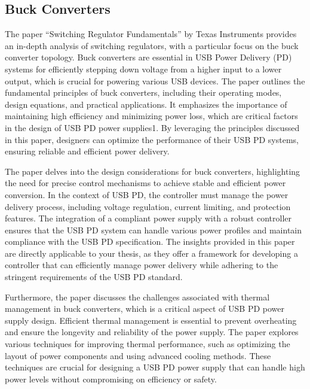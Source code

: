 \subsection{Buck Converters}
The paper “Switching Regulator Fundamentals”\cite{castaldo2019switching} by Texas Instruments provides an in-depth analysis of switching regulators, with a particular focus on the buck converter topology. Buck converters are essential in USB Power Delivery (PD) systems for efficiently stepping down voltage from a higher input to a lower output, which is crucial for powering various USB devices. The paper outlines the fundamental principles of buck converters, including their operating modes, design equations, and practical applications. It emphasizes the importance of maintaining high efficiency and minimizing power loss, which are critical factors in the design of USB PD power supplies1. By leveraging the principles discussed in this paper, designers can optimize the performance of their USB PD systems, ensuring reliable and efficient power delivery\cite{er13}.

The paper \cite{Liu2005}  delves into the design considerations for buck converters, highlighting the need for precise control mechanisms to achieve stable and efficient power conversion. In the context of USB PD, the controller must manage the power delivery process, including voltage regulation, current limiting, and protection features. The integration of a compliant power supply with a robust controller ensures that the USB PD system can handle various power profiles and maintain compliance with the USB PD specification. The insights provided in this paper are directly applicable to your thesis, as they offer a framework for developing a controller that can efficiently manage power delivery while adhering to the stringent requirements of the USB PD standard\cite{er11}\cite{er12}.

Furthermore, the paper \cite{Smail2015} discusses the challenges associated with thermal management in buck converters, which is a critical aspect of USB PD power supply design. Efficient thermal management is essential to prevent overheating and ensure the longevity and reliability of the power supply. The paper explores various techniques for improving thermal performance, such as optimizing the layout of power components and using advanced cooling methods. These techniques are crucial for designing a USB PD power supply that can handle high power levels without compromising on efficiency or safety\cite{er9}\cite{er10}. 
